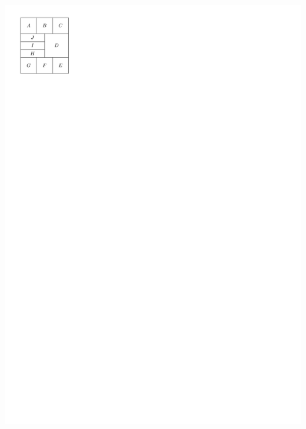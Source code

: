 \documentclass[a4paper]{article}
\begin{document}
\includegraphics[]{./introduction/img/rinsma2Sided.pdf}
\clearpage%
\end{document}
